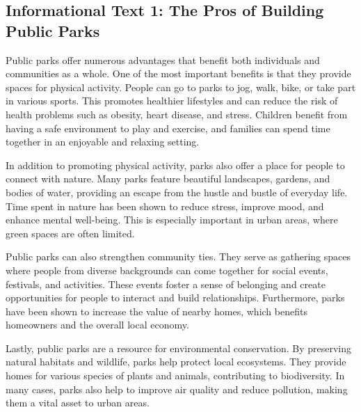 \documentclass[12pt]{article}
\begin{document}
\onehalfspacing


\subsection*{Informational Text 1: The Pros of Building Public Parks}

\begin{tcolorbox}[colframe=black!40, colback=gray!5]

\begin{spacing}{1.15}
    Public parks offer numerous advantages that benefit both individuals and communities as a whole. One of the most important benefits is that they provide spaces for physical activity. People can go to parks to jog, walk, bike, or take part in various sports. This promotes healthier lifestyles and can reduce the risk of health problems such as obesity, heart disease, and stress. Children benefit from having a safe environment to play and exercise, and families can spend time together in an enjoyable and relaxing setting. 

    In addition to promoting physical activity, parks also offer a place for people to connect with nature. Many parks feature beautiful landscapes, gardens, and bodies of water, providing an escape from the hustle and bustle of everyday life. Time spent in nature has been shown to reduce stress, improve mood, and enhance mental well-being. This is especially important in urban areas, where green spaces are often limited. 

    Public parks can also strengthen community ties. They serve as gathering spaces where people from diverse backgrounds can come together for social events, festivals, and activities. These events foster a sense of belonging and create opportunities for people to interact and build relationships. Furthermore, parks have been shown to increase the value of nearby homes, which benefits homeowners and the overall local economy. 

    Lastly, public parks are a resource for environmental conservation. By preserving natural habitats and wildlife, parks help protect local ecosystems. They provide homes for various species of plants and animals, contributing to biodiversity. In many cases, parks also help to improve air quality and reduce pollution, making them a vital asset to urban areas.

\end{spacing}

\end{tcolorbox}
\end{document}
